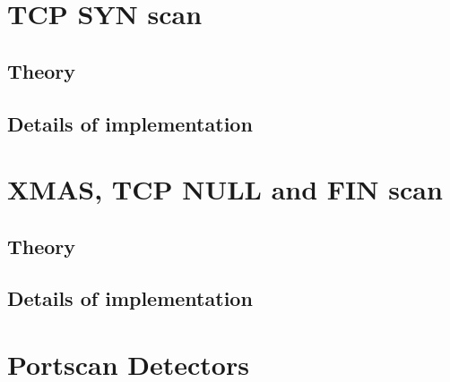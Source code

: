 \documentclass[a4paper]{scrartcl}
\begin{document}
	\section{TCP SYN scan}
	\subsection{Theory}

	
	
	\subsection{Details of implementation}

	
	\section{XMAS, TCP NULL and FIN scan}
		\subsection{Theory}
		
		\subsection{Details of implementation}
		
	\section{Portscan Detectors}
	
	
	
	\newpage
	\printbibliography
\end{document}
